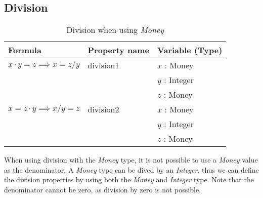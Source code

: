 \subsection*{Division}
\label{ssct:properties_division}
\begin{table}[!ht]
\centering
\begin{tabular}{lll}
\hline
                        \textbf{Formula}                             & \textbf{Property name} & \textbf{Variable (Type)} \\ \hline
\rowcolor[HTML]{EFEFEF} $x \cdot y = z \implies x = z / y$ & division1              & $x$ : Money              \\
\rowcolor[HTML]{EFEFEF}                                              &                        & $y$ : Integer            \\
\rowcolor[HTML]{EFEFEF}                                              &                        & $z$ : Money              \\
                        $x = z \cdot y \implies x / y = z$ & division2              & $x$ : Money              \\
                                                                     &                        & $y$ : Integer            \\
                                                                     &                        & $z$ : Money              \\ \hline
\end{tabular}
\caption{Division when using \textit{Money}}
\label{tbl:ch4_money_division}
\end{table}
\FloatBarrier\noindent
When using division with the \textit{Money} type, it is not possible to use a
\textit{Money} value as the denominator. A \textit{Money} type can be dived by
an \textit{Integer}, thus we can define the division properties by using both
the \textit{Money} and \textit{Integer} type. Note that the denominator cannot
be zero, as division by zero is not possible. %

